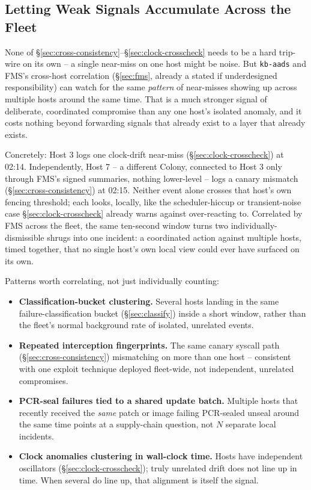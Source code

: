 \documentclass[11pt,a4paper]{article}
\begin{document}
\subsection{Letting Weak Signals Accumulate Across the Fleet}
\label{sec:fleet-accumulate}

None of \S\ref{sec:cross-consistency}--\S\ref{sec:clock-crosscheck}
needs to be a hard trip-wire on its own -- a single near-miss on one
host might be noise. But \texttt{kb-aads} and FMS's cross-host
correlation (\S\ref{sec:fms}, already a stated if underdesigned
responsibility) can watch for the same \emph{pattern} of near-misses
showing up across multiple hosts around the same time. That is a much
stronger signal of deliberate, coordinated compromise than any one
host's isolated anomaly, and it costs nothing beyond forwarding
signals that already exist to a layer that already exists.

Concretely: Host 3 logs one clock-drift near-miss
(\S\ref{sec:clock-crosscheck}) at 02:14. Independently, Host 7 -- a
different Colony, connected to Host 3 only through FMS's signed
summaries, nothing lower-level -- logs a canary mismatch
(\S\ref{sec:cross-consistency}) at 02:15. Neither event alone crosses
that host's own fencing threshold; each looks, locally, like the
scheduler-hiccup or transient-noise case \S\ref{sec:clock-crosscheck}
already warns against over-reacting to. Correlated by FMS across the
fleet, the same ten-second window turns two individually-dismissible
shrugs into one incident: a coordinated action against multiple hosts,
timed together, that no single host's own local view could ever have
surfaced on its own.

Patterns worth correlating, not just individually counting:

\begin{itemize}
  \item \textbf{Classification-bucket clustering.} Several hosts
    landing in the same failure-classification bucket
    (\S\ref{sec:classify}) inside a short window, rather than the
    fleet's normal background rate of isolated, unrelated events.
  \item \textbf{Repeated interception fingerprints.} The same canary
    syscall path (\S\ref{sec:cross-consistency}) mismatching on more
    than one host -- consistent with one exploit technique deployed
    fleet-wide, not independent, unrelated compromises.
  \item \textbf{PCR-seal failures tied to a shared update batch.}
    Multiple hosts that recently received the \emph{same} patch or
    image failing PCR-sealed unseal around the same time points at a
    supply-chain question, not $N$ separate local incidents.
  \item \textbf{Clock anomalies clustering in wall-clock time.} Hosts
    have independent oscillators (\S\ref{sec:clock-crosscheck}); truly
    unrelated drift does not line up in time. When several do line up,
    that alignment is itself the signal.
\end{itemize}
\end{document}
